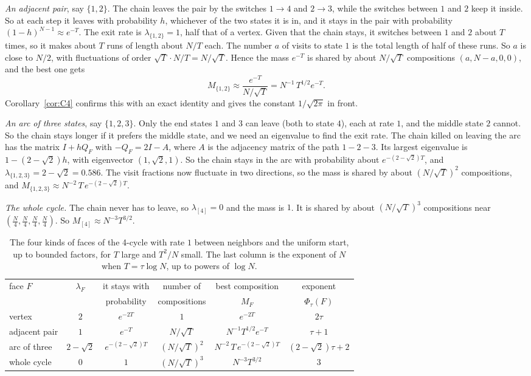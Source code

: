\emph{An adjacent pair}, say $\{1,2\}$. The chain leaves the pair by the
switches $1\to4$ and $2\to3$, while the switches between $1$ and $2$ keep it
inside. So at each step it leaves with probability $h$, whichever of the two
states it is in, and it stays in the pair with probability
$(1-h)^{N-1}\approx e^{-T}$. The exit rate is $\lambda_{\{1,2\}}=1$, half that
of a vertex. Given that the chain stays, it switches between $1$ and $2$ about
$T$ times, so it makes about $T$ runs of length about $N/T$ each. The number
$a$ of visits to state $1$ is the total length of half of these runs. So $a$
is close to $N/2$, with fluctuations of order $\sqrt T\cdot N/T=N/\sqrt T$.
Hence the mass $e^{-T}$ is shared by about $N/\sqrt T$ compositions
$(a,N-a,0,0)$, and the best one gets
\[
 M_{\{1,2\}}\approx\frac{e^{-T}}{N/\sqrt T}=N^{-1}\,T^{1/2}e^{-T}.
\]
Corollary~\ref{cor:C4} confirms this with an exact identity and gives the
constant $1/\sqrt{2\pi}$ in front.

\emph{An arc of three states}, say $\{1,2,3\}$. Only the end states $1$ and $3$
can leave (both to state $4$), each at rate $1$, and the middle state $2$
cannot. So the chain stays longer if it prefers the middle state, and we need
an eigenvalue to find the exit rate. The chain killed on leaving the arc has the
matrix $I+hQ_F$ with $-Q_F=2I-A$, where $A$ is the adjacency matrix of the path
$1-2-3$. Its largest eigenvalue is $1-(2-\sqrt2)h$, with eigenvector
$(1,\sqrt2,1)$. So the chain stays in the arc with probability about
$e^{-(2-\sqrt2)T}$, and $\lambda_{\{1,2,3\}}=2-\sqrt2=0.586$. The visit
fractions now fluctuate in two directions, so the mass is shared by about
$(N/\sqrt T)^2$ compositions, and $M_{\{1,2,3\}}\approx
N^{-2}\,T\,e^{-(2-\sqrt2)T}$.

\emph{The whole cycle.} The chain never has to leave, so $\lambda_{[4]}=0$ and
the mass is $1$. It is shared by about $(N/\sqrt T)^3$ compositions near
$(\frac N4,\frac N4,\frac N4,\frac N4)$. So $M_{[4]}\approx N^{-3}T^{3/2}$.

\begin{table}[t]
\centering\small
\begin{tabular}{@{}lccccc@{}}
\toprule
face $F$ & $\lambda_F$ & it stays with & number of & best composition &
exponent\\
 & & probability & compositions & $M_F$ & $\Phi_\tau(F)$\\
\midrule
vertex & $2$ & $e^{-2T}$ & $1$ & $e^{-2T}$ & $2\tau$\\
adjacent pair & $1$ & $e^{-T}$ & $N/\sqrt T$ & $N^{-1}T^{1/2}e^{-T}$ &
$\tau+1$\\
arc of three & $2-\sqrt2$ & $e^{-(2-\sqrt2)T}$ & $(N/\sqrt T)^2$ &
$N^{-2}\,T\,e^{-(2-\sqrt2)T}$ & $(2-\sqrt2)\tau+2$\\
whole cycle & $0$ & $1$ & $(N/\sqrt T)^3$ & $N^{-3}T^{3/2}$ & $3$\\
\bottomrule
\end{tabular}
\caption{The four kinds of faces of the 4-cycle with rate $1$ between
neighbors and the uniform start, up to bounded factors, for $T$ large and
$T^2/N$ small. The last column is the exponent of $N$ when $T=\tau\log N$, up
to powers of $\log N$.}
\label{tab:C4worked}
\end{table}

